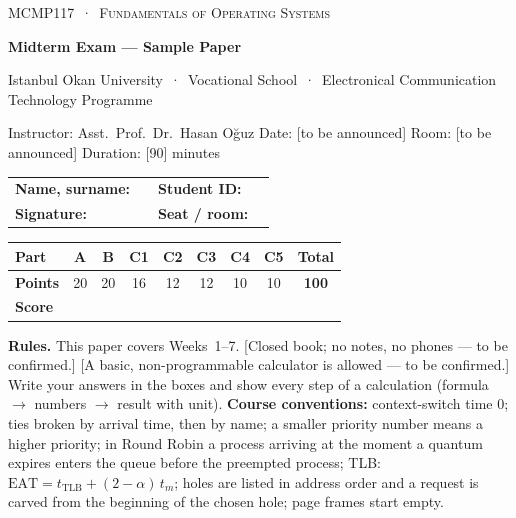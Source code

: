 \thispagestyle{empty}
\begin{tcolorbox}[enhanced,colback=dark,colframe=dark,arc=0pt,boxrule=0pt,
  left=18pt,right=18pt,top=14pt,bottom=14pt,coltext=white]
{\small\color{mint}\textsc{MCMP117 \,·\, Fundamentals of Operating Systems}}\par\smallskip
{\headfont\fontsize{22}{26}\selectfont\bfseries Midterm Exam --- Sample Paper}\par\smallskip
{\small Istanbul Okan University \,·\, Vocational School \,·\, Electronical Communication Technology Programme}\par
{\small Instructor: Asst.\ Prof.\ Dr.\ Hasan Oğuz \quad Date: [to be announced] \quad Room: [to be announced] \quad Duration: [90] minutes}
\end{tcolorbox}

\begin{center}
\renewcommand{\arraystretch}{1.6}
\begin{tabularx}{\linewidth}{@{}lX lX@{}}
\textbf{Name, surname:} & \hrulefill & \textbf{Student ID:} & \hrulefill \\
\textbf{Signature:} & \hrulefill & \textbf{Seat / room:} & \hrulefill \\
\end{tabularx}

\vspace{0.4em}
\renewcommand{\arraystretch}{1.35}
\begin{tabular}{|l|c|c|c|c|c|c|c|c|}
\hline
\textbf{Part} & A & B & C1 & C2 & C3 & C4 & C5 & \textbf{Total} \\ \hline
\textbf{Points} & 20 & 20 & 16 & 12 & 12 & 10 & 10 & \textbf{100} \\ \hline
\textbf{Score} & & & & & & & & \\[0.4em] \hline
\end{tabular}
\end{center}

\textbf{Rules.} This paper covers Weeks~1--7. [Closed book; no notes, no phones --- to be confirmed.] [A basic, non-programmable calculator is allowed --- to be confirmed.] Write your answers in the boxes and show every step of a calculation (formula $\to$ numbers $\to$ result with unit). \textbf{Course conventions:} context-switch time $0$; ties broken by arrival time, then by name; a smaller priority number means a higher priority; in Round Robin a process arriving at the moment a quantum expires enters the queue before the preempted process; TLB: $\text{EAT} = t_{\text{TLB}} + (2-\alpha)\,t_m$; holes are listed in address order and a request is carved from the beginning of the chosen hole; page frames start empty.

